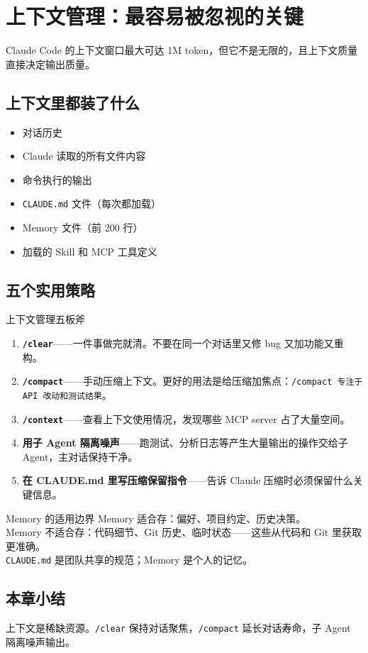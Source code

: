 \section{上下文管理：最容易被忽视的关键}

Claude Code 的上下文窗口最大可达 1M token，但它不是无限的，且上下文质量直接决定输出质量。

\subsection{上下文里都装了什么}

\begin{itemize}[leftmargin=1.5em]
  \item 对话历史
  \item Claude 读取的所有文件内容
  \item 命令执行的输出
  \item \texttt{CLAUDE.md} 文件（每次都加载）
  \item Memory 文件（前 200 行）
  \item 加载的 Skill 和 MCP 工具定义
\end{itemize}

\subsection{五个实用策略}

\begin{importantbox}{上下文管理五板斧}
\begin{enumerate}[leftmargin=1.5em]
  \item \textbf{\texttt{/clear}}——一件事做完就清。不要在同一个对话里又修 bug 又加功能又重构。
  \item \textbf{\texttt{/compact}}——手动压缩上下文。更好的用法是给压缩加焦点：\texttt{/compact 专注于 API 改动和测试结果}。
  \item \textbf{\texttt{/context}}——查看上下文使用情况，发现哪些 MCP server 占了大量空间。
  \item \textbf{用子 Agent 隔离噪声}——跑测试、分析日志等产生大量输出的操作交给子 Agent，主对话保持干净。
  \item \textbf{在 CLAUDE.md 里写压缩保留指令}——告诉 Claude 压缩时必须保留什么关键信息。
\end{enumerate}
\end{importantbox}

\begin{warningbox}{Memory 的适用边界}
Memory 适合存：偏好、项目约定、历史决策。\\
Memory 不适合存：代码细节、Git 历史、临时状态——这些从代码和 Git 里获取更准确。\\
\texttt{CLAUDE.md} 是团队共享的规范；Memory 是个人的记忆。
\end{warningbox}

\subsection{本章小结}

上下文是稀缺资源。\texttt{/clear} 保持对话聚焦，\texttt{/compact} 延长对话寿命，子 Agent 隔离噪声输出。

